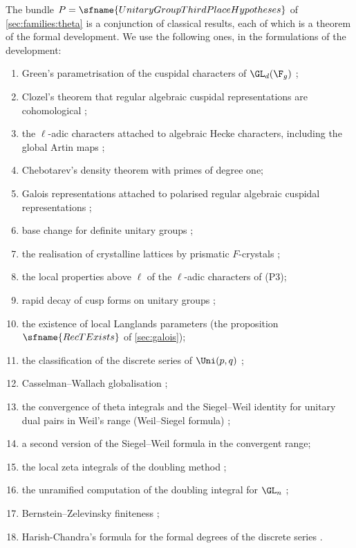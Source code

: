 The bundle $P=\sfname{UnitaryGroupThirdPlaceHypotheses}$ of \cref{sec:families:theta} is a conjunction of
classical results, each of which is a theorem of the formal development. We use the following ones, in the
formulations of the development:
\begin{enumerate}[label=(P\arabic*),leftmargin=*]
\item\label{pf:onto3:P:green} Green's parametrisation of the cuspidal characters of $\GL_d(\F_g)$ \cite{Green1955};
\item\label{pf:onto3:P:clozel} Clozel's theorem that regular algebraic cuspidal representations are cohomological
\cite{Clozel1990};
\item\label{pf:onto3:P:hecke} the $\ell$-adic characters attached to algebraic Hecke characters, including the
global Artin maps \cite{Serre1968};
\item\label{pf:onto3:P:cheb} Chebotarev's density theorem with primes of degree one;
\item\label{pf:onto3:P:galrep} Galois representations attached to polarised regular algebraic cuspidal
representations \cite{ClozelHarrisLabesse2011,ChenevierHarris2013};
\item\label{pf:onto3:P:bc} base change for definite unitary groups \cite{Labesse2011};
\item\label{pf:onto3:P:bs} the realisation of crystalline lattices by prismatic $F$-crystals
\cite{BhattScholze2023};
\item\label{pf:onto3:P:above} the local properties above $\ell$ of the $\ell$-adic characters of (P3);
\item\label{pf:onto3:P:decay} rapid decay of cusp forms on unitary groups \cite{HarishChandra1968,MoeglinWaldspurger1995};
\item\label{pf:onto3:P:llc} the existence of local Langlands parameters (the proposition $\sfname{RecTExists}$ of
\cref{sec:galois});
\item\label{pf:onto3:P:ds} the classification of the discrete series of $\Uni(p,q)$ \cite{HarishChandra1966};
\item\label{pf:onto3:P:cw} Casselman--Wallach globalisation \cite{Casselman1989,Wallach1992};
\item\label{pf:onto3:P:ws} the convergence of theta integrals and the Siegel--Weil identity for unitary dual pairs
in Weil's range (Weil--Siegel formula) \cite{Weil1965,Ichino2004};
\item\label{pf:onto3:P:sw} a second version of the Siegel--Weil formula in the convergent range;
\item\label{pf:onto3:P:dm} the local zeta integrals of the doubling method \cite{GelbartPiatetskiShapiroRallis1987};
\item\label{pf:onto3:P:udm} the unramified computation of the doubling integral for $\GL_n$
\cite{GelbartPiatetskiShapiroRallis1987,LapidRallis2005};
\item\label{pf:onto3:P:bz} Bernstein--Zelevinsky finiteness \cite{BernsteinZelevinsky1976};
\item\label{pf:onto3:P:fd} Harish-Chandra's formula for the formal degrees of the discrete series
\cite{HarishChandra1966}.
\end{enumerate}

